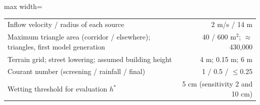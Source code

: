 \begin{table}[htbp]
\begin{adjustbox}{max width=\textwidth}
\begin{tabular}{lrrrrrrr}
\multicolumn{5}{l}{Inflow velocity / radius of each source} & \multicolumn{3}{r}{2 m/s / 14 m}\\
\multicolumn{5}{l}{Maximum triangle area (corridor / elsewhere); triangles, first model generation} & \multicolumn{3}{r}{40 / 600 m$^2$; $\approx$430,000}\\
\multicolumn{5}{l}{Terrain grid; street lowering; assumed building height} & \multicolumn{3}{r}{4 m; 0.15 m; 6 m}\\
\multicolumn{5}{l}{Courant number (screening / rainfall / final)} & \multicolumn{3}{r}{1 / 0.5 / $\le$0.25}\\
\multicolumn{5}{l}{Wetting threshold for evaluation $h^*$} & \multicolumn{3}{r}{5 cm (sensitivity 2 and 10 cm)}\\
\bottomrule\end{tabular}\end{adjustbox}\end{table}
